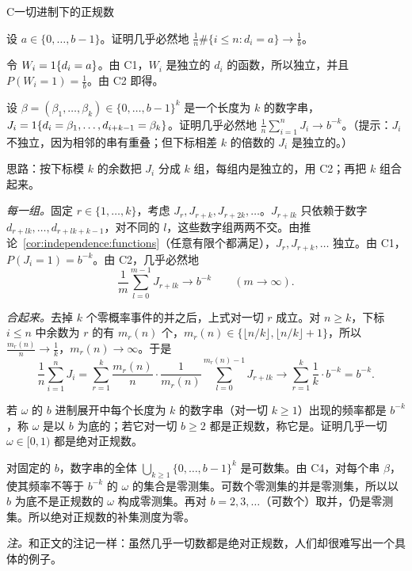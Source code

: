 \begin{probleme}{C}{一切进制下的正规数}
\begin{questions}
\item 设 $a\in\{0,\dots,b-1\}$。证明几乎必然地 $\frac1n\#\{i\leqslant n:d_i=a\}\to\frac1b$。
\begin{solution}
令 $W_i=1\{d_i=a\}$。由 C1，$W_i$ 是独立的 $d_i$ 的函数，所以独立，并且 $P(W_i=1)=\frac1b$。由 C2 即得。
\end{solution}

\item 设 $\beta=(\beta_1,\dots,\beta_k)\in\{0,\dots,b-1\}^k$ 是一个长度为 $k$ 的数字串，$J_i=1\{d_i=\beta_1,\dots,d_{i+k-1}=\beta_k\}$。证明几乎必然地 $\frac1n\sum_{i=1}^nJ_i\to b^{-k}$。（提示：$J_i$ 不独立，因为相邻的串有重叠；但下标相差 $k$ 的倍数的 $J_i$ 是独立的。）
\begin{solution}
思路：按下标模 $k$ 的余数把 $J_i$ 分成 $k$ 组，每组内是独立的，用 C2；再把 $k$ 组合起来。

\emph{每一组。}固定 $r\in\{1,\dots,k\}$，考虑 $J_r,J_{r+k},J_{r+2k},\dots$。$J_{r+lk}$ 只依赖于数字 $d_{r+lk},\dots,d_{r+lk+k-1}$，对不同的 $l$，这些数字组两两不交。由推论~\ref{cor:independence:functions}（任意有限个都满足），$J_r,J_{r+k},\dots$ 独立。由 C1，$P(J_i=1)=b^{-k}$。由 C2，几乎必然地
\[
\frac1m\sum_{l=0}^{m-1}J_{r+lk}\to b^{-k}\qquad(m\to\infty).
\]

\emph{合起来。}去掉 $k$ 个零概率事件的并之后，上式对一切 $r$ 成立。对 $n\geqslant k$，下标 $i\leqslant n$ 中余数为 $r$ 的有 $m_r(n)$ 个，$m_r(n)\in\{\lfloor n/k\rfloor,\lfloor n/k\rfloor+1\}$，所以 $\frac{m_r(n)}n\to\frac1k$，$m_r(n)\to\infty$。于是
\[
\frac1n\sum_{i=1}^nJ_i=\sum_{r=1}^k\frac{m_r(n)}n\cdot\frac1{m_r(n)}\sum_{l=0}^{m_r(n)-1}J_{r+lk}\to\sum_{r=1}^k\frac1k\cdot b^{-k}=b^{-k}.
\]
\end{solution}

\item 若 $\omega$ 的 $b$ 进制展开中每个长度为 $k$ 的数字串（对一切 $k\geqslant1$）出现的频率都是 $b^{-k}$，称 $\omega$ 是以 $b$ 为底的；若它对一切 $b\geqslant2$ 都是正规数，称它是。证明几乎一切 $\omega\in[0,1)$ 都是绝对正规数。
\begin{solution}
对固定的 $b$，数字串的全体 $\bigcup_{k\geqslant1}\{0,\dots,b-1\}^k$ 是可数集。由 C4，对每个串 $\beta$，使其频率不等于 $b^{-k}$ 的 $\omega$ 的集合是零测集。可数个零测集的并是零测集，所以以 $b$ 为底不是正规数的 $\omega$ 构成零测集。再对 $b=2,3,\dots$（可数个）取并，仍是零测集。所以绝对正规数的补集测度为零。

\emph{注。}和正文的注记一样：虽然几乎一切数都是绝对正规数，人们却很难写出一个具体的例子。
\end{solution}
\end{questions}
\end{probleme}

